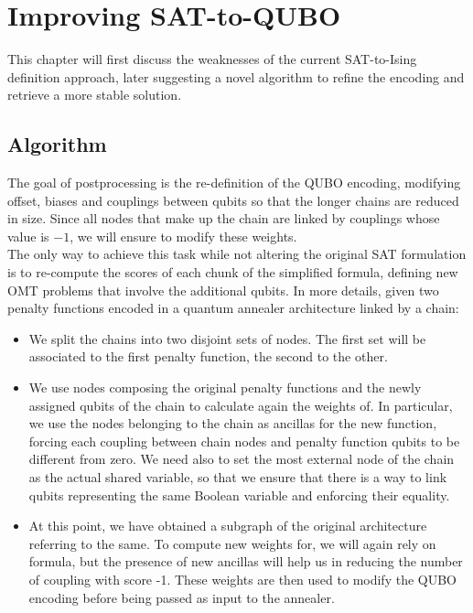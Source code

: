 \chapter{Improving SAT-to-QUBO}
\label{cha:QAcore}

This chapter will first discuss the weaknesses of the current SAT-to-Ising definition approach, later suggesting a novel algorithm to refine the encoding and retrieve a more stable solution. 

\section{Algorithm}

The goal of postprocessing is the re-definition of the QUBO encoding, modifying offset, biases and couplings between qubits so that the longer chains are reduced in size. Since all nodes that make up the chain are linked by couplings whose value is $-1$, we will ensure to modify these weights. \\
The only way to achieve this task while not altering the original SAT formulation is to re-compute the scores of each chunk of the simplified formula, defining new OMT problems that involve the additional qubits. In more details, given two penalty functions encoded in a quantum annealer architecture linked by a chain:

\begin{itemize}
    \item We split the chains into two disjoint sets of nodes. The first set will be associated to the first penalty function, the second to the other.
    \item We use nodes composing the original penalty functions and the newly assigned qubits of the chain to calculate again the weights of. In particular, we use the nodes belonging to the chain as ancillas for the new function, forcing each coupling between chain nodes and penalty function qubits to be different from zero. We need also to set the most external node of the chain as the actual shared variable, so that we ensure that there is a way to link qubits representing the same Boolean variable and enforcing their equality.
    \item At this point, we have obtained a subgraph of the original architecture referring to the same. To compute new weights for, we will again rely on formula, but the presence of new ancillas will help us in reducing the number of coupling with score -1. These weights are then used to modify the QUBO encoding before being passed as input to the annealer.
\end{itemize}

